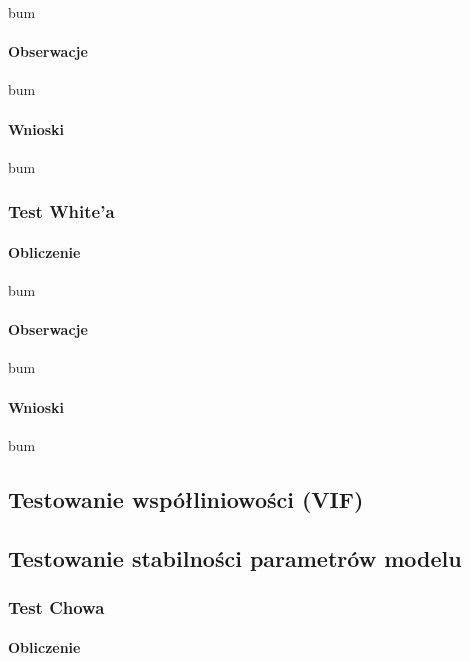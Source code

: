 \documentclass[
  11pt,
]{article}
\begin{document}
bum

\paragraph{Obserwacje}\label{obserwacje-11}

bum

\paragraph{Wnioski}\label{wnioski-11}

bum

\subsubsection{Test White'a}\label{test-whitea}

\paragraph{Obliczenie}\label{obliczenie-8}

bum

\paragraph{Obserwacje}\label{obserwacje-12}

bum

\paragraph{Wnioski}\label{wnioski-12}

bum

\subsection{Testowanie współliniowości
(VIF)}\label{testowanie-wspuxf3ux142liniowoux15bci-vif}

\subsection{Testowanie stabilności parametrów
modelu}\label{testowanie-stabilnoux15bci-parametruxf3w-modelu}

\subsubsection{Test Chowa}\label{test-chowa}

\paragraph{Obliczenie}\label{obliczenie-9}
\end{document}
